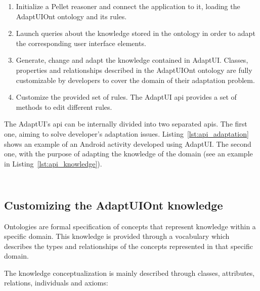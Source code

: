 \begin{enumerate}[label=\alph*)]
 \item Initialize a Pellet reasoner and connect the application to it, loading
 the AdaptUIOnt ontology and its rules.
 
 \item Launch queries about the knowledge stored in the ontology in order to
 adapt the corresponding user interface elements.
 
 \item Generate, change and adapt the knowledge contained in AdaptUI. Classes,
 properties and relationships described in the AdaptUIOnt ontology are fully
 customizable by developers to cover the domain of their adaptation problem.
 
 \item Customize the provided set of rules. The AdaptUI \ac{api} provides a set of
 methods to edit different rules.
\end{enumerate}

The AdaptUI's \ac{api} can be internally divided into two separated \acp{api}. 
The first one, aiming to solve developer's adaptation issues. 
Listing~\ref{lst:api_adaptation} shows an example of an Android activity 
developed using AdaptUI. The second one, with the purpose of adapting the 
knowledge of the domain (see an example in Listing~\ref{lst:api_knowledge}).

\inputminted[linenos=true, fontsize=\footnotesize, frame=lines]{java}{4_system_architecture/api_adaptation.java}

\inputminted[linenos=true, fontsize=\footnotesize, frame=lines]{java}{4_system_architecture/api_knowledge.java}


\subsection{Customizing the AdaptUIOnt knowledge}
\label{sec:knowledge_editor}
Ontologies are formal specification of concepts that represent knowledge within
a specific domain. This knowledge is provided through a vocabulary which describes
the types and relationships of the concepts represented in that specific domain.

The knowledge conceptualization is mainly described through classes, attributes,
relations, individuals and axioms: 

